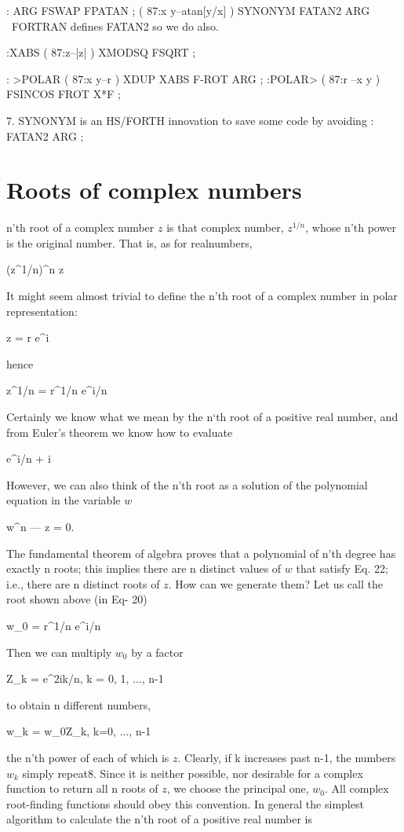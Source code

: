: ARG FSWAP FPATAN ; ( 87:x y--atan[y/x] )
SYNONYM FATAN2 ARG
\ FORTRAN defines FATAN2 so we do also.

:XABS                ( 87:z--|z| )
    XMODSQ FSQRT ;

: >POLAR             ( 87:x y--r \theta[radians] )
    XDUP XABS F-ROT ARG ;
:POLAR>              ( 87:r \theta[radians]--x y )
    FSINCOS FROT X*F ;

7. SYNONYM is an HS/FORTH innovation to save some code by avoiding : FATAN2 ARG ;

\section{Roots of complex numbers}
 n'th root of a complex number $z$ is that complex number, $z^{1/n}$, whose n'th power is the original number. That is, as for realnumbers,

(z^{1/n})^n \equiv z

It might seem almost trivial to define the n’th root of a complex number in polar representation:

z = r e^{i\theta}

hence

z^{1/n} = r^{1/n} e^{i\theta/n}

Certainly we know what we mean by the n‘th root of a positive real number, and from Euler’s theorem we know how to evaluate

e^{i\theta/n} \equiv \cos{} + i \sin{}

However, we can also think of the n'th root as a solution of the polynomial equation in the variable $w$

w^n — z = 0.

The fundamental theorem of algebra proves that a polynomial of n'th degree has exactly n roots; this implies there are n distinct values of $w$ that satisfy Eq. 22; i.e., there are n distinct roots of $z$. How can we generate them? Let us call the root shown above (in Eq- 20)

w_0 = r^{1/n} e^{i\theta/n}

Then we can multiply $w_0$ by a factor

Z_k = e^{2\pi ik/n}, k = 0, 1, ..., n-1

to obtain n different numbers,

w_k = w_0Z_k, k=0, ..., n-1

the n’th power of each of which is $z$. Clearly, if k increases past n-1, the numbers $w_k$ simply repeat8. Since it is neither possible, nor desirable for a complex function to return all n roots of $z$, we choose the principal one, $w_0$. All complex root-finding functions should obey this convention. In general the simplest algorithm to calculate the n’th root of a positive real number is

